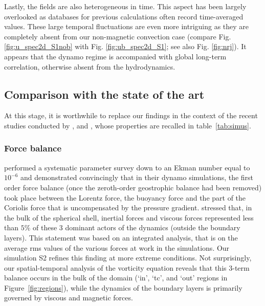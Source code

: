\documentclass[12pt, a4paper]{article}
\begin{document}
Lastly, the fields are also heterogeneous in time.
This aspect has been largely overlooked as databases for previous calculations often record time-averaged values.
These large temporal fluctuations are even more intriguing as they are completely absent from our non-magnetic convection case (compare Fig. \ref{fig:u_spec2d_S1nob} with Fig. \ref{fig:ub_spec2d_S1}; see also Fig. \ref{fig:nrj}).
It appears that the dynamo regime is accompanied with global long-term correlation, otherwise absent from the hydrodynamics.






\subsection{Comparison with the state of the art}
At this stage, it is worthwhile to replace our findings in the context of the recent studies conducted
by \citet{yadav2016b}, \citet{sheyko2016} and \citet{aubert2017}, whose properties are recalled in table~\ref{tab:simus}. 

\subsubsection{Force balance}
\cite{yadav2016b} 
performed a systematic parameter survey down to an Ekman number equal to $10^{-6}$ and
demonstrated convincingly that in their dynamo simulations, the first order force balance 
(once the zeroth-order geostrophic balance had been removed) 
took place between the Lorentz force, the buoyancy force and the part of the Coriolis force that is
uncompensated by the pressure gradient. \cite{yadav2016b} stressed that, in the bulk of the spherical shell, 
inertial forces and viscous forces represented less than $5\%$ of these 3 dominant actors of the dynamics
(outside the boundary layers).  
This statement was based on an integrated analysis, that is on the average rms values of the various forces at work in the simulations.
Our simulation S2 refines this finding at more extreme conditions.
Not surprisingly, our spatial-temporal analysis of the vorticity equation reveals that this 3-term balance occurs in the bulk of the domain (`in', `tc', and `out' regions in Figure~\ref{fig:regions}), while the dynamics of the boundary layers is primarily governed by viscous and magnetic forces.
\end{document}
